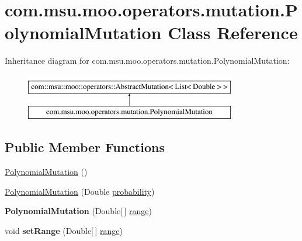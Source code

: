\hypertarget{classcom_1_1msu_1_1moo_1_1operators_1_1mutation_1_1PolynomialMutation}{\section{com.\-msu.\-moo.\-operators.\-mutation.\-Polynomial\-Mutation Class Reference}
\label{classcom_1_1msu_1_1moo_1_1operators_1_1mutation_1_1PolynomialMutation}
}
Inheritance diagram for com.\-msu.\-moo.\-operators.\-mutation.\-Polynomial\-Mutation\-:\begin{figure}[H]
\begin{center}
\leavevmode
\includegraphics[height=2.000000cm]{classcom_1_1msu_1_1moo_1_1operators_1_1mutation_1_1PolynomialMutation}
\end{center}
\end{figure}
\subsection*{Public Member Functions}
\begin{DoxyCompactItemize}
\item 
\hyperlink{classcom_1_1msu_1_1moo_1_1operators_1_1mutation_1_1PolynomialMutation_ae8ba9e14d445f820b53b04e4b1e644fc}{Polynomial\-Mutation} ()
\item 
\hyperlink{classcom_1_1msu_1_1moo_1_1operators_1_1mutation_1_1PolynomialMutation_a265b9ed40d686047a56521bbed462c96}{Polynomial\-Mutation} (Double \hyperlink{classcom_1_1msu_1_1moo_1_1operators_1_1mutation_1_1PolynomialMutation_ac70d8ffc1d71d3d3c28554eecebf69db}{probability})
\item 
\hypertarget{classcom_1_1msu_1_1moo_1_1operators_1_1mutation_1_1PolynomialMutation_a8432510b01750db3c0b412f38ce984dd}{{\bfseries Polynomial\-Mutation} (Double\mbox{[}$\,$\mbox{]} \hyperlink{classcom_1_1msu_1_1moo_1_1operators_1_1mutation_1_1PolynomialMutation_ab96c1108fc7a705fa962bdc611fcf152}{range})}\label{classcom_1_1msu_1_1moo_1_1operators_1_1mutation_1_1PolynomialMutation_a8432510b01750db3c0b412f38ce984dd}

\item 
\hypertarget{classcom_1_1msu_1_1moo_1_1operators_1_1mutation_1_1PolynomialMutation_aef773cf9e54603246e065c4fd4931633}{void {\bfseries set\-Range} (Double\mbox{[}$\,$\mbox{]} \hyperlink{classcom_1_1msu_1_1moo_1_1operators_1_1mutation_1_1PolynomialMutation_ab96c1108fc7a705fa962bdc611fcf152}{range})}\label{classcom_1_1msu_1_1moo_1_1operators_1_1mutation_1_1PolynomialMutation_aef773cf9e54603246e065c4fd4931633}

\end{DoxyCompactItemize}
